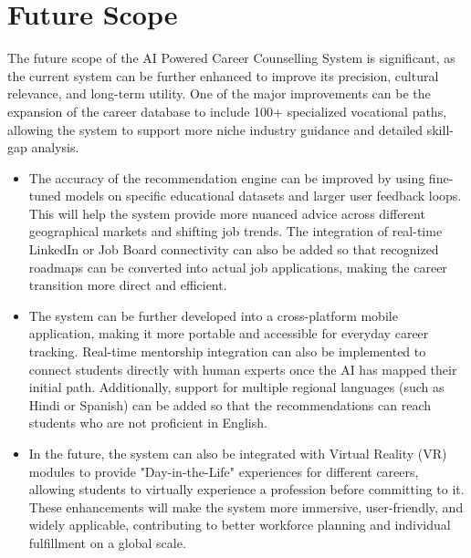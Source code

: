 \section{Future Scope}
{}The future scope of the AI Powered Career Counselling System is significant, as the current system can be further enhanced to improve its precision, cultural relevance, and long-term utility. One of the major improvements can be the expansion of the career database to include 100+ specialized vocational paths, allowing the system to support more niche industry guidance and detailed skill-gap analysis.
\begin{itemize}
 \item The accuracy of the recommendation engine can be improved by using fine-tuned models on specific educational datasets and larger user feedback loops. This will help the system provide more nuanced advice across different geographical markets and shifting job trends. The integration of real-time LinkedIn or Job Board connectivity can also be added so that recognized roadmaps can be converted into actual job applications, making the career transition more direct and efficient.
 \item The system can be further developed into a cross-platform mobile application, making it more portable and accessible for everyday career tracking. Real-time mentorship integration can also be implemented to connect students directly with human experts once the AI has mapped their initial path. Additionally, support for multiple regional languages (such as Hindi or Spanish) can be added so that the recommendations can reach students who are not proficient in English.
 \item In the future, the system can also be integrated with Virtual Reality (VR) modules to provide "Day-in-the-Life" experiences for different careers, allowing students to virtually experience a profession before committing to it. These enhancements will make the system more immersive, user-friendly, and widely applicable, contributing to better workforce planning and individual fulfillment on a global scale.
\end{itemize}
